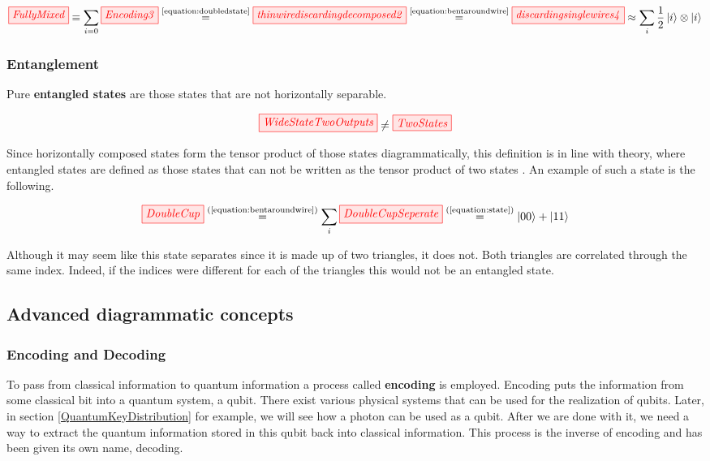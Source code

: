 \documentclass[]{article}
\newcommand{\equaltext}[1]{\ensuremath{\stackrel{\text{#1}}{=}}}
\begin{document}
\begin{equation}
	\label{equation:FullyMixed}
	\tikzfig{FullyMixed} \equiv \sum\limits_{i=0} \tikzfig{Encoding3} \equaltext{\ref{equation:doubledstate}} \tikzfig{thinwirediscardingdecomposed2}  \equaltext{\ref{equation:bentaroundwire}} \tikzfig{discardingsinglewires4} \approx \sum\limits_{i} \frac{1}{2} \ket{i} \otimes \ket{i}
\end{equation}

\subsubsection{Entanglement}
\label{entanglement}
Pure \textbf{entangled states} are those states that are not horizontally separable.

\begin{equation}
\tikzfig{WideStateTwoOutputs} \neq \tikzfig{TwoStates}
\end{equation}

Since horizontally composed states form the tensor product of those states diagrammatically, this definition is in line with theory, where entangled states are defined as those states that can not be written as the tensor product of two states \cite{Nielsen2011}. An example of such a state is the following.

\begin{equation}
\tikzfig{DoubleCup} \equaltext{(\ref{equation:bentaroundwire})} \sum\limits_{i} \tikzfig{DoubleCupSeperate} \equaltext{(\ref{equation:state})} \ket{00} + \ket{11}
\end{equation}

Although it may seem like this state separates since it is made up of two triangles, it does not. Both triangles are correlated through the same index. Indeed, if the indices were different for each of the triangles this would not be an entangled state.

\subsection{Advanced diagrammatic concepts}

\subsubsection{Encoding and Decoding}
\label{encodingdecoding}

To pass from classical information to quantum information a process called \textbf{encoding} is employed. Encoding puts the information from some classical bit into a quantum system, a qubit. There exist various physical systems that can be used for the realization of qubits. Later, in section \ref{QuantumKeyDistribution} for example, we will see how a photon can be used as a qubit. After we are done with it, we need a way to extract the quantum information stored in this qubit back into classical information. This process is the inverse of encoding and has been given its own name, decoding. 
\end{document}
